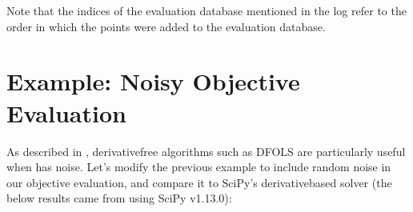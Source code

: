 \documentclass[letterpaper,10pt,english]{sphinxmanual}
\begin{document}
\sphinxAtStartPar
Note that the indices of the evaluation database mentioned in the log refer to the order in which the points were added to the evaluation database.


\section{Example: Noisy Objective Evaluation}
\label{\detokenize{userguide:example-noisy-objective-evaluation}}
\sphinxAtStartPar
As described in {\hyperref[\detokenize{info::doc}]{}}, derivative\sphinxhyphen{}free algorithms such as DFO\sphinxhyphen{}LS are particularly useful when  has noise. Let’s modify the previous example to include random noise in our objective evaluation, and compare it to SciPy’s derivative\sphinxhyphen{}based solver (the below results came from using SciPy v1.13.0):
\end{document}
